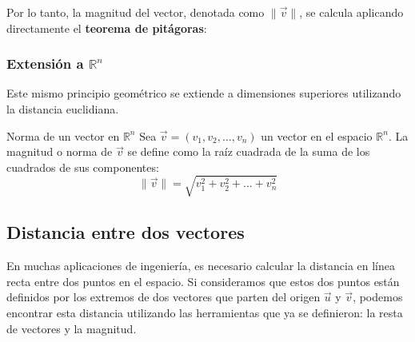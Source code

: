 Por lo tanto, la magnitud del vector, denotada como $\|\vec{v}\|$, se calcula aplicando directamente el \textbf{teorema de pitágoras}:

\begin{center}
\shorthandoff{>}
\end{center}

\subsubsection{Extensión a $\mathbb{R}^n$}

Este mismo principio geométrico se extiende a dimensiones superiores utilizando la distancia euclidiana. 

\begin{mydefinition}{Norma de un vector en $\mathbb{R}^n$}
Sea $\vec{v} = (v_1, v_2, \dots, v_n)$ un vector en el espacio $\mathbb{R}^n$. La magnitud o norma de $\vec{v}$ se define como la raíz cuadrada de la suma de los cuadrados de sus componentes:
\[ \|\vec{v}\| = \sqrt{v_1^2 + v_2^2 + \dots + v_n^2} \]
\end{mydefinition}

\subsection{Distancia entre dos vectores}

En muchas aplicaciones de ingeniería, es necesario calcular la distancia en línea recta entre dos puntos en el espacio. Si consideramos que estos dos puntos están definidos por los extremos de dos vectores que parten del origen $\vec{u}$ y $\vec{v}$, podemos encontrar esta distancia utilizando las herramientas que ya se definieron: la resta de vectores y la magnitud.

